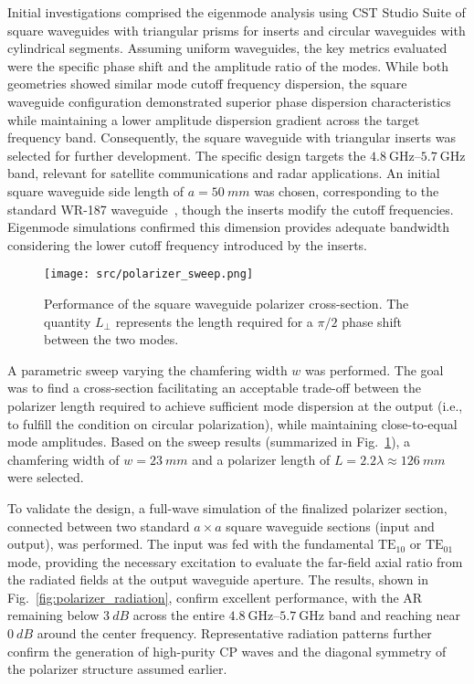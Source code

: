 \documentclass[journal]{IEEEtran}
\newcommand{\frequencyrange}{\qtyrange{4.8}{5.7}{\giga\hertz}}
\newcommand{\TE}[2]{\text{TE}_{#1#2}}
\begin{document}
Initial investigations comprised the eigenmode analysis using CST Studio Suite of square waveguides with triangular prisms for inserts and circular waveguides with cylindrical segments. Assuming uniform waveguides, the key metrics evaluated were the specific phase shift and the amplitude ratio of the modes. While both geometries showed similar mode cutoff frequency dispersion, the square waveguide configuration demonstrated superior phase dispersion characteristics while maintaining a lower amplitude dispersion gradient across the target frequency band. Consequently, the square waveguide with triangular inserts was selected for further development. The specific design targets the $\frequencyrange$ band, relevant for satellite communications and radar applications. An initial square waveguide side length of $a = \qty{50}{mm}$ was chosen, corresponding to the standard WR-187 waveguide~\cite{spinner:waveguide-specifications}, though the inserts modify the cutoff frequencies. Eigenmode simulations confirmed this dimension provides adequate bandwidth considering the lower cutoff frequency introduced by the inserts.

\begin{figure}[!ht]
    \centering
    \texttt{[image: src/polarizer\_sweep.png]}
    \caption{\label{fig:polarizer-sweep} Performance of the square waveguide polarizer cross-section. The quantity $L_\perp$ represents the length required for a $\pi/2$ phase shift between the two modes.}
\end{figure}

A parametric sweep varying the chamfering width $w$ was performed. The goal was to find a cross-section facilitating an acceptable trade-off between the polarizer length required to achieve sufficient mode dispersion at the output (i.e., to fulfill the condition on circular polarization), while maintaining close-to-equal mode amplitudes. Based on the sweep results (summarized in Fig.~\ref{fig:polarizer-sweep}), a chamfering width of $w = \qty{23}{mm}$ and a polarizer length of $L = 2.2\lambda \approx \qty{126}{mm}$ were selected.

To validate the design, a full-wave simulation of the finalized polarizer section, connected between two standard $a \times a$ square waveguide sections (input and output), was performed. The input was fed with the fundamental $\TE 10$ or $\TE 01$ mode, providing the necessary excitation to evaluate the far-field axial ratio from the radiated fields at the output waveguide aperture. The results, shown in Fig.~\ref{fig:polarizer_radiation}, confirm excellent performance, with the AR remaining below $\qty{3}{dB}$ across the entire $\frequencyrange$ band and reaching near $\qty{0}{dB}$ around the center frequency. Representative radiation patterns further confirm the generation of high-purity CP waves and the diagonal symmetry of the polarizer structure assumed earlier.
\end{document}
